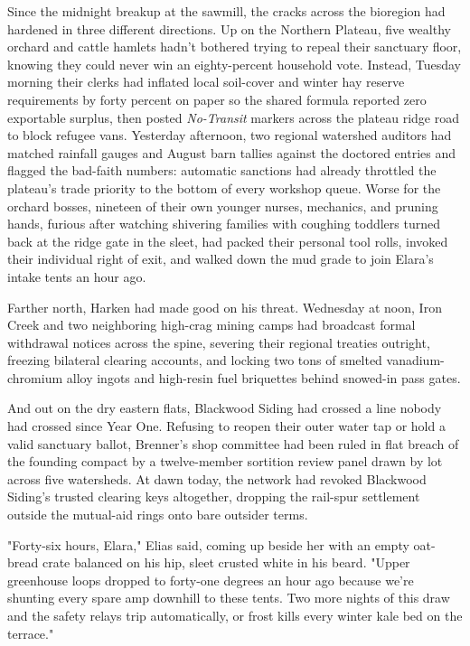 Since the midnight breakup at the sawmill, the cracks across the bioregion had hardened in three different directions. Up on the Northern Plateau, five wealthy orchard and cattle hamlets hadn't bothered trying to repeal their sanctuary floor, knowing they could never win an eighty-percent household vote. Instead, Tuesday morning their clerks had inflated local soil-cover and winter hay reserve requirements by forty percent on paper so the shared formula reported zero exportable surplus, then posted \textit{No-Transit} markers across the plateau ridge road to block refugee vans. Yesterday afternoon, two regional watershed auditors had matched rainfall gauges and August barn tallies against the doctored entries and flagged the bad-faith numbers: automatic sanctions had already throttled the plateau's trade priority to the bottom of every workshop queue. Worse for the orchard bosses, nineteen of their own younger nurses, mechanics, and pruning hands, furious after watching shivering families with coughing toddlers turned back at the ridge gate in the sleet, had packed their personal tool rolls, invoked their individual right of exit, and walked down the mud grade to join Elara's intake tents an hour ago.

Farther north, Harken had made good on his threat. Wednesday at noon, Iron Creek and two neighboring high-crag mining camps had broadcast formal withdrawal notices across the spine, severing their regional treaties outright, freezing bilateral clearing accounts, and locking two tons of smelted vanadium-chromium alloy ingots and high-resin fuel briquettes behind snowed-in pass gates.

And out on the dry eastern flats, Blackwood Siding had crossed a line nobody had crossed since Year One. Refusing to reopen their outer water tap or hold a valid sanctuary ballot, Brenner's shop committee had been ruled in flat breach of the founding compact by a twelve-member sortition review panel drawn by lot across five watersheds. At dawn today, the network had revoked Blackwood Siding's trusted clearing keys altogether, dropping the rail-spur settlement outside the mutual-aid rings onto bare outsider terms.

"Forty-six hours, Elara," Elias said, coming up beside her with an empty oat-bread crate balanced on his hip, sleet crusted white in his beard. "Upper greenhouse loops dropped to forty-one degrees an hour ago because we're shunting every spare amp downhill to these tents. Two more nights of this draw and the safety relays trip automatically, or frost kills every winter kale bed on the terrace."

